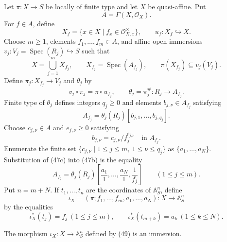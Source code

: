 \begin{definition}
  \label{def:nagata-quasi-affine-immersion-affine-space}
  \lean{}

  Let $\pi\colon X\to S$ be locally of finite type and let $X$ be
  quasi-affine.  Put
  \[
    A=\Gamma(X,\mathcal O_X).
  \]
  For $f\in A$, define
  \[
    X_f=\{x\in X\mid f_x\in\mathcal O_{X,x}^{\times}\},
    \qquad u_f\colon X_f\hookrightarrow X.
  \]
  Choose $m\geq1$, elements $f_1,\ldots,f_m\in A$, and affine open
  immersions
  $v_j\colon V_j=\operatorname{Spec}(R_j)\hookrightarrow S$ such that
  \[
    X=\bigcup_{j=1}^mX_{f_j},\qquad
    X_{f_j}=\operatorname{Spec}(A_{f_j}),\qquad
    \pi(X_{f_j})\subseteq v_j(V_j).
  \]
  Define $\pi_j\colon X_{f_j}\to V_j$ and $\theta_j$ by
  \[
    v_j\circ\pi_j=\pi\circ u_{f_j},
    \qquad
    \theta_j=\pi_j^\#\colon R_j\to A_{f_j}.                       \tag{47a}
  \]
  Finite type of $\theta_j$ defines integers $q_j\geq0$ and elements
  $b_{j,\nu}\in A_{f_j}$ satisfying
  \[
    A_{f_j}=\theta_j(R_j)[b_{j,1},\ldots,b_{j,q_j}].              \tag{47b}
  \]
  Choose $c_{j,\nu}\in A$ and $e_{j,\nu}\geq0$ satisfying
  \[
    b_{j,\nu}=c_{j,\nu}/f_j^{e_{j,\nu}}\quad\text{in }A_{f_j}.    \tag{47c}
  \]
  Enumerate the finite set
  $\{c_{j,\nu}\mid1\leq j\leq m,\ 1\leq\nu\leq q_j\}$ as
  $\{a_1,\ldots,a_N\}$.  Substitution of (47c) into (47b) is the equality
  \[
    A_{f_j}
      =\theta_j(R_j)\!\left[
          \frac{a_1}{1},\ldots,\frac{a_N}{1},\frac1{f_j}
        \right]\qquad(1\leq j\leq m).                              \tag{48}
  \]
  Put $n=m+N$.  If $t_1,\ldots,t_n$ are the coordinates of
  $\mathbb A^n_S$, define
  \[
    \iota_X=(\pi;f_1,\ldots,f_m,a_1,\ldots,a_N)
      \colon X\to\mathbb A^n_S                                   \tag{49}
  \]
  by the equalities
  \[
    \iota_X^*(t_j)=f_j\ (1\leq j\leq m),\qquad
    \iota_X^*(t_{m+k})=a_k\ (1\leq k\leq N).
  \]
\end{definition}

\begin{lemma}
  \label{lemma:nagata-quasi-affine-immersion-affine-space}
  \lean{}

  The morphism $\iota_X\colon X\to\mathbb A^n_S$ defined by (49) is an
  immersion.
\end{lemma}

